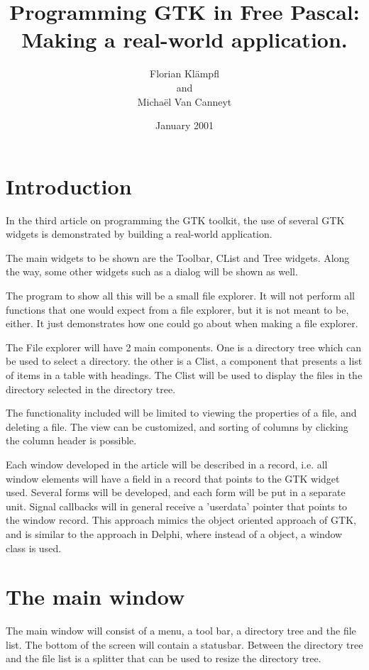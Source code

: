 \documentclass[10pt]{article}
\begin{document}
\title{Programming GTK in Free Pascal: Making a real-world application.}
\author{Florian Kl\"ampfl\\and\\Micha\"el Van Canneyt}
\date{January 2001}
\maketitle
\section{Introduction}
In the third article on programming the GTK toolkit, the use of several
GTK widgets is demonstrated by building a real-world application. 

The main widgets to be shown are the Toolbar, CList and Tree widgets. 
Along the way, some other widgets such as a dialog will be shown as well.

The program to show all this will be a small file explorer. It will not
perform all functions that one would expect from a file explorer, but it
is not meant to be, either. It just demonstrates how one could go about when
making a file explorer. 

The File explorer will have 2 main components. One is a directory tree
which can be used to select a directory. the other is a Clist, a component
that presents a list of items in a table with headings. The Clist will be
used to display the files in the directory selected in the directory tree.

The functionality included will be limited to viewing the properties of
a file, and deleting a file. The view can be customized, and sorting of
columns by clicking the column header is possible.

Each window developed in the article will be described in a record, i.e.
all window elements will have a field in a record that points to the 
GTK widget used. Several forms will be developed, and each form will be
put in a separate unit. Signal callbacks will in general receive a
'userdata' pointer that points to the window record. This approach mimics
the object oriented approach of GTK, and is similar to the approach in
Delphi, where instead of a object, a window class is used.

\section{The main window}
The main window will consist of a menu, a tool bar, a directory tree and
the file list. The bottom of the screen will contain a statusbar. Between
the directory tree and the file list is a splitter that can be used to
resize the directory tree.
\end{document}
